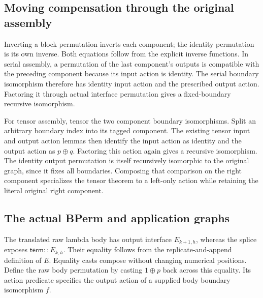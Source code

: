 \subsection{Moving compensation through the original assembly}
Inverting a block permutation inverts each component; the identity permutation
is its own inverse. Both equations follow from the explicit inverse functions.
In serial assembly, a permutation of the last component's outputs is compatible
with the preceding component because its input action is identity. The serial
boundary isomorphism therefore has identity input action and the prescribed
output action. Factoring it through actual interface permutation gives a
fixed-boundary recursive isomorphism.


For tensor assembly, tensor the two component boundary isomorphisms. Split an
arbitrary boundary index into its tagged component. The existing tensor input
and output action lemmas then identify the input action as identity and the
output action as $p\oplus q$. Factoring this action again gives a recursive
isomorphism. The identity output permutation is itself recursively isomorphic
to the original graph, since it fixes all boundaries. Composing that comparison
on the right component specializes the tensor theorem to a left-only action
while retaining the literal original right component.


\subsection{The actual BPerm and application graphs}
The translated raw lambda body has output interface $E_{k+1,h}$, whereas the
splice exposes $\mathsf{term}::E_{k,h}$. Their equality follows from the
replicate-and-append definition of $E$. Equality casts compose without changing
numerical positions. Define the raw body permutation by casting $1\oplus p$
back across this equality. Its action predicate specifies the output action
of a supplied body boundary isomorphism $f$.

